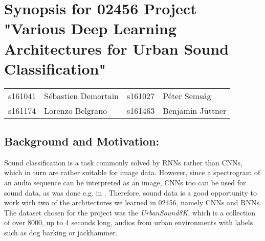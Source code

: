 \documentclass[utf-8]{article}
\newcommand{\urb}{\textit{UrbanSound8K}}
\begin{document}
\section*{Synopsis for 02456 Project "Various Deep Learning Architectures for Urban Sound Classification"}
\begin{tabular}{ll|ll}
s161041 &Sébastien Demortain &s161027 &Péter Semság\\
 s161174 &Lorenzo Belgrano &s161463 &Benjamin Jüttner
\end{tabular}

\subsection*{Background and Motivation:}
Sound classification is a task commonly solved by RNNs rather than CNNs, which in turn are rather suitable for image data. However, since a spectrogram of an audio sequence can be interpreted as an image, CNNs too can be used for sound data, as was done e.g. in \cite{pizza}. Therefore, sound data is a good opportunity to work with two of the architectures we learned in 02456, namely CNNs and RNNs. The dataset chosen for the project was the \urb\cite{urban}, which is a collection of over 8000, up to 4 seconds long, audios from urban environments with labels such as dog barking or jackhammer.  
\end{document}
